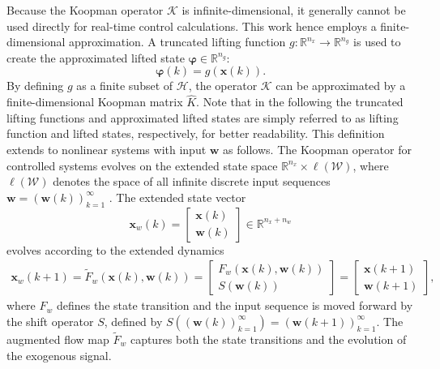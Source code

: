 Because the Koopman operator $\mathcal{K}$ is infinite-dimensional, it generally cannot be used directly for real-time control calculations. This work hence employs a finite-dimensional approximation. A truncated lifting function $g: \mathbb{R}^{n_{x}} \to \mathbb{R}^{n_{g}}$ is used to create the approximated lifted state $\bm{\varphi} \in \mathbb{R}^{n_{g}}$:
\begin{equation}
    \bm{\varphi}(k) = g(\bm{x}(k)). \label{eq:observ}
\end{equation}
By defining $g$ as a finite subset of $\mathcal{H}$, the operator $\mathcal{K}$ can be approximated by a finite-dimensional Koopman matrix $\hat{K}$. Note that in the following the truncated lifting functions and approximated lifted states are simply referred to as lifting function and lifted states, respectively, for better readability.
%
This definition extends to nonlinear systems with input $\bm{w}$ as follows. The Koopman operator for controlled systems evolves on the extended state space $\mathbb{R}^{n_{x}} \times \ell(\mathcal{W})$, where $\ell(\mathcal{W})$ denotes the space of all infinite discrete input sequences $\bm{w} = (\bm{w}(k))_{k=1}^\infty$ \cite{arbabi2018data, korda2018linear}. The extended state vector 
\[
\bm{x}_w(k) = \begin{bmatrix} \bm{x}(k) \\ \bm{w}(k) \end{bmatrix} \in \mathbb{R}^{n_x + n_w}
\]
evolves according to the extended dynamics
\begin{align} \label{eq:KoopStateForced}
    \bm{x}_w(k+1) = \tilde{F}_w(\bm{x}(k), \bm{w}(k)) = \begin{bmatrix} F_w(\bm{x}(k), \bm{w}(k)) \\ S(\bm{w}(k)) \end{bmatrix} = \begin{bmatrix} \bm{x}(k+1) \\ \bm{w}(k+1) \end{bmatrix},
\end{align}
where $F_w$ defines the state transition and the input sequence is moved forward by the shift operator $S$, defined by $S\left( (\bm{w}(k))_{k=1}^\infty \right) = (\bm{w}(k+1))_{k=1}^\infty$. The augmented flow map $\tilde{F}_w$ captures both the state transitions and the evolution of the exogenous signal.

